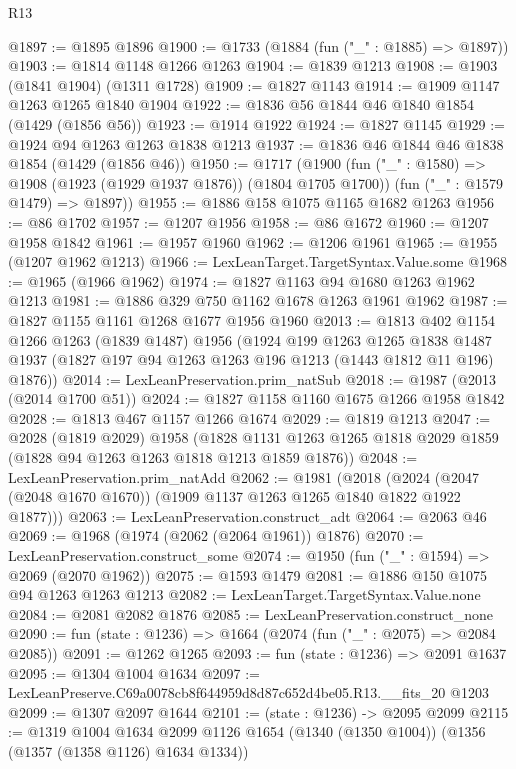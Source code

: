 \begin{lexlean}{R13}
\begin{coremodule}
@1897 := @1895 @1896
@1900 := @1733 (@1884 (fun ("_" : @1885) => @1897))
@1903 := @1814 @1148 @1266 @1263
@1904 := @1839 @1213
@1908 := @1903 (@1841 @1904) (@1311 @1728)
@1909 := @1827 @1143
@1914 := @1909 @1147 @1263 @1265 @1840 @1904
@1922 := @1836 @56 @1844 @46 @1840 @1854 (@1429 (@1856 @56))
@1923 := @1914 @1922
@1924 := @1827 @1145
@1929 := @1924 @94 @1263 @1263 @1838 @1213
@1937 := @1836 @46 @1844 @46 @1838 @1854 (@1429 (@1856 @46))
@1950 := @1717
    (@1900
      (fun ("_" : @1580) => @1908 (@1923 (@1929 @1937 @1876)) (@1804 @1705 @1700))
      (fun ("_" : @1579 @1479) => @1897))
@1955 := @1886 @158 @1075 @1165 @1682 @1263
@1956 := @86 @1702
@1957 := @1207 @1956
@1958 := @86 @1672
@1960 := @1207 @1958 @1842
@1961 := @1957 @1960
@1962 := @1206 @1961
@1965 := @1955 (@1207 @1962 @1213)
@1966 := LexLeanTarget.TargetSyntax.Value.some
@1968 := @1965 (@1966 @1962)
@1974 := @1827 @1163 @94 @1680 @1263 @1962 @1213
@1981 := @1886 @329 @750 @1162 @1678 @1263 @1961 @1962
@1987 := @1827 @1155 @1161 @1268 @1677 @1956 @1960
@2013 := @1813
    @402
    @1154
    @1266
    @1263
    (@1839 @1487)
    @1956
    (@1924
      @199
      @1263
      @1265
      @1838
      @1487
      @1937
      (@1827 @197 @94 @1263 @1263 @196 @1213 (@1443 @1812 @11 @196) @1876))
@2014 := LexLeanPreservation.prim_natSub
@2018 := @1987 (@2013 (@2014 @1700 @51))
@2024 := @1827 @1158 @1160 @1675 @1266 @1958 @1842
@2028 := @1813 @467 @1157 @1266 @1674
@2029 := @1819 @1213
@2047 := @2028
    (@1819 @2029)
    @1958
    (@1828 @1131 @1263 @1265 @1818 @2029 @1859 (@1828 @94 @1263 @1263 @1818 @1213 @1859 @1876))
@2048 := LexLeanPreservation.prim_natAdd
@2062 := @1981
    (@2018 (@2024 (@2047 (@2048 @1670 @1670)) (@1909 @1137 @1263 @1265 @1840 @1822 @1922 @1877)))
@2063 := LexLeanPreservation.construct_adt
@2064 := @2063 @46
@2069 := @1968 (@1974 (@2062 (@2064 @1961)) @1876)
@2070 := LexLeanPreservation.construct_some
@2074 := @1950 (fun ("_" : @1594) => @2069 (@2070 @1962))
@2075 := @1593 @1479
@2081 := @1886 @150 @1075 @94 @1263 @1263 @1213
@2082 := LexLeanTarget.TargetSyntax.Value.none
@2084 := @2081 @2082 @1876
@2085 := LexLeanPreservation.construct_none
@2090 := fun (state : @1236) => @1664 (@2074 (fun ("_" : @2075) => @2084 @2085))
@2091 := @1262 @1265
@2093 := fun (state : @1236) => @2091 @1637
@2095 := @1304 @1004 @1634
@2097 := LexLeanPreserve.C69a0078cb8f644959d8d87c652d4be05.R13.__fits_20 @1203
@2099 := @1307 @2097 @1644
@2101 := (state : @1236) -> @2095 @2099
@2115 := @1319
    @1004
    @1634
    @2099
    @1126
    @1654
    (@1340 (@1350 @1004))
    (@1356 (@1357 (@1358 @1126) @1634 @1334))

\end{coremodule}
\end{lexlean}
